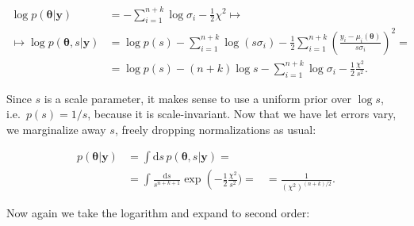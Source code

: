 \begin{align}
    \log p(\boldsymbol\theta|\mathbf y)
    &= -\sum_{i=1}^{n+k} \log\sigma_i - \frac12 \chi^2 \mapsto \\
    \mapsto \log p(\boldsymbol\theta,s|\mathbf y)
    &= \log p(s) -\sum_{i=1}^{n+k} \log(s \sigma_i)
    - \frac 12 \sum_{i=1}^{n+k}
    \left( \frac {y_i - \mu_i(\boldsymbol\theta)} {s \sigma_i} \right)^2 = \\
    &= \log p(s) - (n+k) \log s - \sum_{i=1}^{n+k} \log\sigma_i
    - \frac 12 \frac{\chi^2}{s^2}.
\end{align}

Since $s$ is a scale parameter, it makes sense to use a uniform prior over
$\log s$, i.e.\ $p(s) = 1/s$, because it is scale-invariant. Now that we have
let errors vary, we marginalize away $s$, freely dropping normalizations as
usual:

\begin{align}
    p(\boldsymbol\theta|\mathbf y)
    &= \int \mathrm ds\,
    p(\boldsymbol\theta,s|\mathbf y) = \\
    &= \int \frac {\mathrm ds} {s^{n+k+1}}
    \exp\left(-\frac12 \frac {\chi^2} {s^2}) =
    &= \frac 1 {(\chi^2)^{(n+k)/2}}.
\end{align}

Now again we take the logarithm and expand to second order:

\begin{align}
    
\end{align}
